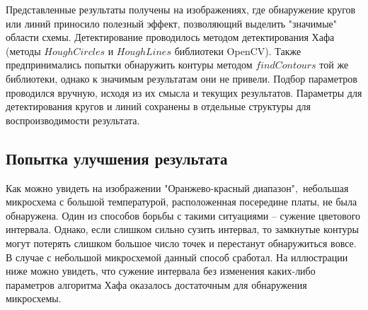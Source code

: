 








Представленные результаты получены на изображениях, где обнаружение кругов или линий приносило полезный эффект, позволяющий выделить "значимые" $\;$области схемы.
\newline
Детектирование проводилось методом детектирования Хафа (методы $HoughCircles$ и $HoughLines$ библиотеки OpenCV). Также предпринимались попытки обнаружить контуры методом $findContours$ той же библиотеки, однако к значимым результатам они не привели.
\newline
Подбор параметров проводился вручную, исходя из их смысла и текущих результатов. Параметры для детектирования кругов и линий сохранены в отдельные структуры для воспроизводимости результата.

\subsection{Попытка улучшения результата}
Как можно увидеть на изображении "Оранжево-красный диапазон"$,$ небольшая микросхема с большой температурой, расположенная посередине платы, не была обнаружена. Один из способов борьбы с такими ситуациями -- сужение цветового интервала. Однако, если слишком сильно сузить интервал, то замкнутые контуры могут потерять слишком большое число точек и перестанут обнаружиться вовсе.
\newline 
В случае с небольшой микросхемой данный способ сработал. На иллюстрации ниже можно увидеть, что сужение интервала без изменения каких-либо параметров алгоритма Хафа оказалось достаточным для обнаружения микросхемы.

